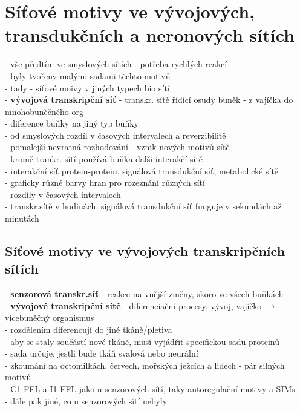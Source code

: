 \documentclass[11pt,a4paper]{report}
\begin{document}
\chapter{Síťové motivy ve vývojových, transdukčních a neronových sítích}
- vše předtím ve smyslových sítích - potřeba rychlých reakcí\\
- byly tvořeny malými sadami těchto motivů\\
- tady - síťové moivy v jiných typech bio sítí\\
- \textbf{vývojová transkripční síť} - transkr. sítě řídící osudy buněk - z vajíčka do mnohobuněčného org\\
\indent - diference buňky na jiný typ buňky\\
\indent - od smyslových rozdíl v časových intervalech a reverzibilitě\\
\indent \indent - pomalejší nevratná rozhodování - vznik nových motivů sítě\\
- kromě trankr. sítí používá buňka další interakčí sítě\\
\indent - interakční síť protein-protein, signálová transdukční síť, metabolické sítě\\
\indent \indent - graficky různé barvy hran pro rozeznání různých sítí\\
\indent \indent - rozdíly v časových intervalech\\
\indent \indent \indent - transkr.sítě v hodinách, signálová transdukční síť funguje v sekundách až minutách\\

\section{Síťové motivy ve vývojových transkripčních sítích}
- \textbf{senzorová transkr.síť} - reakce na vnější změny, skoro ve všech buňkách\\
- \textbf{vývojové transkripční sítě} - diferenciační procesy, vývoj, vajíčko $\rightarrow$ vícebuněčný organismus\\
\indent - rozdělením diferencují do jiné tkáně/pletiva\\
\indent \indent - aby se staly součástí nové tkáně, musí vyjádřit specifickou sadu proteinů\\
\indent \indent \indent - sada určuje, jestli bude tkáň svalová nebo neurální\\
\indent - zkoumání na octomilkách, červech, mořských ježcích a lidech - pár silných motivů\\
\indent \indent - C1-FFL a I1-FFL jako u senzorových sítí, taky autoregulační motivy a SIMs\\
\indent \indent - dále pak jiné, co u senzorových sítí nebyly\\
\end{document}
